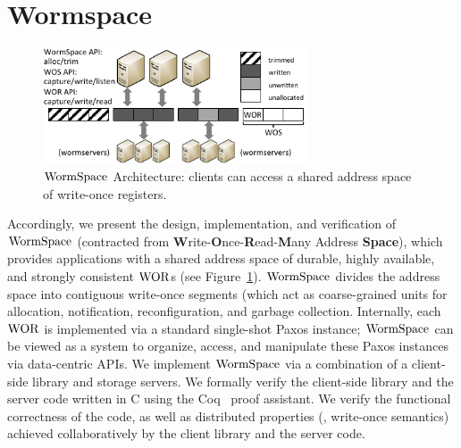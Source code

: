 \section{Wormspace}
\label{chapter:wormspace:sec:wormspace}


\begin{figure}
\centering
\includegraphics[width=0.7\textwidth, page=1]{figs/multipaxos/pics-small.pdf}
\caption{$\mathrm{WormSpace}$ Architecture: clients can access a shared address space of write-once registers.}
\label{fig:chapter:multipaxos:overview}
\end{figure}


Accordingly, we present the design, implementation, and verification of $\mathrm{WormSpace}$ (contracted from \textbf{W}rite-\textbf{O}nce-\textbf{R}ead-\textbf{M}any Address \textbf{Space}), which provides applications with a shared address space of durable, highly available, and strongly consistent $\mathrm{WOR}$s (see Figure~\ref{fig:chapter:multipaxos:overview}). $\mathrm{WormSpace}$ divides the address space into contiguous write-once segments (which act as coarse-grained units for allocation, notification, reconfiguration, and garbage collection. Internally, each $\mathrm{WOR}$ is implemented via a standard single-shot Paxos instance; $\mathrm{WormSpace}$ can be viewed as a system to organize, access, and manipulate these Paxos instances via data-centric APIs. We implement $\mathrm{WormSpace}$ via a combination of a client-side library and storage servers. We formally verify the client-side library and the server code written in C using the Coq~\cite{coq} proof assistant. We verify the functional correctness of the code, as well as distributed properties (\eg, write-once semantics) achieved collaboratively by the client library and the server code.

